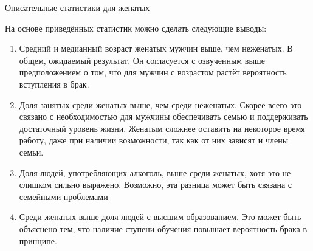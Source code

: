 \documentclass[a4paper,12pt]{article}
\begin{document}
\begin{table}[ht]
{}
\caption{Описательные статистики для женатых \label{tab1} }
\vspace{2em}
	\centering
\caption{Описательные статистики для холостых \label{tab2}}
\end{table}

На основе приведённых статистик можно сделать следующие выводы:

\begin{enumerate}[\Sun]
	\item Средний и медианный возраст женатых мужчин выше, чем неженатых. В общем, ожидаемый результат. Он согласуется с озвученным выше предположением о том, что для мужчин с возрастом растёт вероятность вступления в брак. 
	
	\item Доля занятых среди женатых выше, чем среди неженатых. Скорее всего это связано с необходимостью для мужчины обеспечивать семью и поддерживать достаточный уровень жизни. Женатым сложнее оставить на некоторое время работу, даже при наличии возможности, так как от них зависят и члены семьи.
	
	\item Доля людей, употребляющих алкоголь, выше среди женатых, хотя это не слишком сильно выражено. Возможно, эта разница может быть связана с семейными проблемами
	
	\item Среди женатых выше доля людей с высшим образованием. Это может быть объяснено тем, что наличие ступени обучения повышает вероятность брака в принципе.
\end{enumerate}
\end{document}
